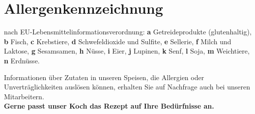 \documentclass[a4paper,10pt,notumble]{leaflet}
\begin{document}

\section*{Allergenkennzeichnung}
nach EU-Lebensmittelinformationsverordnung: 
\textbf{a} Getreideprodukte (glutenhaltig), 
\textbf{b} Fisch,
\textbf{c} Krebstiere,
\textbf{d} Schwefeldioxide und Sulfite,
\textbf{e} Sellerie,
\textbf{f} Milch und Laktose,
\textbf{g} Sesamsamen,
\textbf{h} Nüsse,
\textbf{i} Eier,
\textbf{j} Lupinen,
\textbf{k} Senf,
\textbf{l} Soja,
\textbf{m} Weichtiere,
\textbf{n} Erdnüsse. 

Informationen über Zutaten in unseren Speisen, die Allergien
oder Unverträglichkeiten auslösen können, erhalten Sie auf Nachfrage
auch bei unseren Mitarbeitern.\\
\textbf{Gerne passt unser Koch das Rezept auf Ihre Bedürfnisse an.} %
\end{document}
